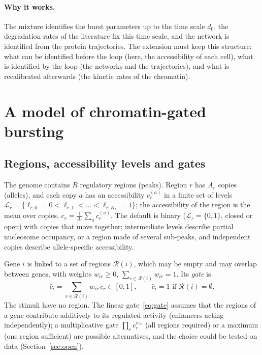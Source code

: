 \documentclass[a4paper, 11pt]{article}
\newcommand{\cbar}{\bar c}
\newcommand{\Lv}{\mathcal{L}}
\newcommand{\Rg}{\mathcal{R}}
\theoremstyle{plain}
\theoremstyle{remark}
\begin{document}
\paragraph{Why it works.} The mixture identifies the burst parameters up to the time scale $d_0$, the degradation rates of the literature fix this time scale, and the network is identified from the protein trajectories. The extension must keep this structure: what can be identified before the loop (here, the accessibility of each cell), what is identified by the loop (the networks and the trajectories), and what is recalibrated afterwards (the kinetic rates of the chromatin).

\section{A model of chromatin-gated bursting}\label{sec:model}

\subsection{Regions, accessibility levels and gates}

The genome contains $R$ regulatory regions (peaks). Region $r$ has $A_r$ copies (alleles), and each copy $a$ has an accessibility $c_r^{(a)}$ in a finite set of levels $\Lv_r = \{\ell_{r,0} = 0 < \ell_{r,1} < \dots < \ell_{r,K_r} = 1\}$; the accessibility of the region is the mean over copies, $c_r = \frac{1}{A_r}\sum_a c_r^{(a)}$. The default is binary ($\Lv_r = \{0, 1\}$, closed or open) with copies that move together; intermediate levels describe partial nucleosome occupancy, or a region made of several sub-peaks, and independent copies describe allele-specific accessibility.

Gene $i$ is linked to a set of regions $\Rg(i)$, which may be empty and may overlap between genes, with weights $w_{ir} \geq 0$, $\sum_{r\in\Rg(i)} w_{ir} = 1$. Its \emph{gate} is
\begin{equation}\label{eq:gate}
\cbar_i = \sum_{r\in\Rg(i)} w_{ir}\,c_r \in [0,1], \qquad \cbar_i = 1 \text{ if } \Rg(i) = \emptyset .
\end{equation}
The stimuli have no region. The linear gate~\eqref{eq:gate} assumes that the regions of a gene contribute additively to its regulated activity (enhancers acting independently); a multiplicative gate $\prod_r c_r^{w_{ir}}$ (all regions required) or a maximum (one region sufficient) are possible alternatives, and the choice could be tested on data (Section~\ref{sec:open}).
\end{document}
